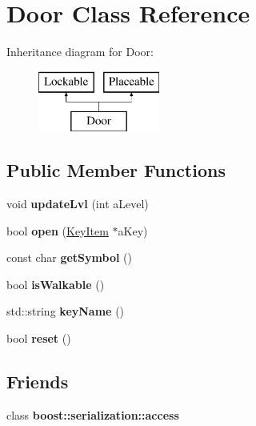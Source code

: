 \hypertarget{class_door}{}\section{Door Class Reference}
\label{class_door}
Inheritance diagram for Door\+:\begin{figure}[H]
\begin{center}
\leavevmode
\includegraphics[height=2.000000cm]{class_door}
\end{center}
\end{figure}
\subsection*{Public Member Functions}
\begin{DoxyCompactItemize}
\item 
\hypertarget{class_door_a60ffd182da3a5663b0a1215117b8a3fd}{}\label{class_door_a60ffd182da3a5663b0a1215117b8a3fd} 
void {\bfseries update\+Lvl} (int a\+Level)
\item 
\hypertarget{class_door_a2accb2023adfd41f0b1c2944d48ffd0c}{}\label{class_door_a2accb2023adfd41f0b1c2944d48ffd0c} 
bool {\bfseries open} (\hyperlink{class_key_item}{Key\+Item} $\ast$a\+Key)
\item 
\hypertarget{class_door_a8ec117c3a051d43dba6f571e0068cf48}{}\label{class_door_a8ec117c3a051d43dba6f571e0068cf48} 
const char {\bfseries get\+Symbol} ()
\item 
\hypertarget{class_door_a7736b689448b00c26407c20c8826777f}{}\label{class_door_a7736b689448b00c26407c20c8826777f} 
bool {\bfseries is\+Walkable} ()
\item 
\hypertarget{class_door_a8676c57077d910a740a786ba1885f492}{}\label{class_door_a8676c57077d910a740a786ba1885f492} 
std\+::string {\bfseries key\+Name} ()
\item 
\hypertarget{class_door_a739d0097860e447091024c1dbe57ca55}{}\label{class_door_a739d0097860e447091024c1dbe57ca55} 
bool {\bfseries reset} ()
\end{DoxyCompactItemize}
\subsection*{Friends}
\begin{DoxyCompactItemize}
\item 
\hypertarget{class_door_ac98d07dd8f7b70e16ccb9a01abf56b9c}{}\label{class_door_ac98d07dd8f7b70e16ccb9a01abf56b9c} 
class {\bfseries boost\+::serialization\+::access}
\end{DoxyCompactItemize}
